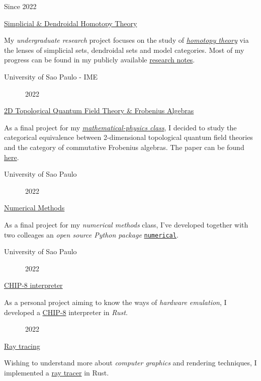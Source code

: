 \documentclass[letterpaper]{twentyonesecondcv} %
\begin{document}
{\begin{twentymid} %
    \twentymiditem
    {Since 2022}{
    \href{https://link.springer.com/book/10.1007/978-3-031-10447-3}
    {\textcolor{mainblue}{Simplicial \& Dendroidal Homotopy Theory}}

    My \emph{undergraduate research} project focuses on the study of
    \href{https://ncatlab.org/nlab/show/Introduction+to+Homotopy+Theory}{\emph{homotopy
      theory}} via the lenses of simplicial sets, dendroidal sets and model
    categories. Most of my progress can be found in my publicly available
    \href{https://luizmugnaini.github.io/deep-dive}{research notes}.

    }{University of Sao Paulo - IME}

    \twentymiditem
    {~~~~~~2022}{
      \href{https://fismat.pablopie.xyz/pdf/monografias/luiz.pdf}
      {\textcolor{mainblue}{2D Topological Quantum Field Theory \& Frobenius Algebras}}

      As a final project for my
      \href{https://sites.google.com/view/cristian-ortiz/usp2022-math-physics}{\emph{mathematical-physics
          class}}, I decided to study the categorical equivalence between
      2-dimensional topological quantum field theories and the category of
      commutative Frobenius algebras. The paper can be found
      \href{https://fismat.pablopie.xyz/pdf/monografias/luiz.pdf}{here}.

    }{University of Sao Paulo}

    \twentymiditem
    {~~~~~~2022}{
      \href{https://github.com/luizmugnaini/numerical}
      {\textcolor{mainblue}{Numerical Methods}}

      As a final project for my \emph{numerical methods} class, I've developed
      together with two colleages an \emph{open source Python package}
      \href{https://github.com/luizmugnaini/numerical}{\texttt{numerical}}.

    }{University of Sao Paulo}

    \twentymiditem
    {~~~~~~2022}{
      \href{https://github.com/luizmugnaini/chirp}
      {\textcolor{mainblue}{CHIP-8 interpreter}}

      As a personal project aiming to know the ways of \emph{hardware emulation}, I
      developed a \href{https://en.wikipedia.org/wiki/CHIP-8}{CHIP-8}
      interpreter in \emph{Rust}.

    }{}

    \twentymiditem
    {~~~~~~2022}{
      \href{https://github.com/luizmugnaini/radiant}
      {\textcolor{mainblue}{Ray tracing}}

      Wishing to understand more about \emph{computer graphics} and rendering
      techniques, I implemented a
      \href{https://en.wikipedia.org/wiki/Ray_tracing_(graphics)}{ray tracer} in
      Rust.

    }{}

\end{twentymid}

}
\end{document}
